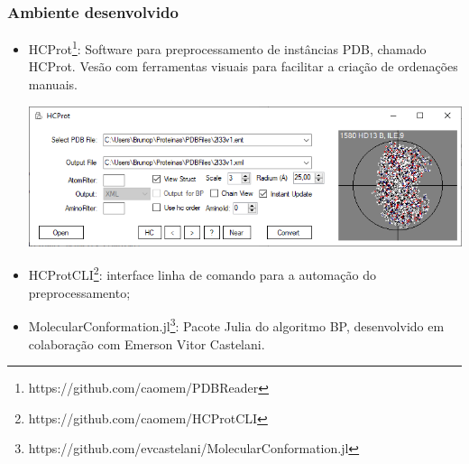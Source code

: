 \documentclass[10pt]{beamer}
\theoremstyle{plain}
\theoremstyle{definition}
\begin{document}
	\begin{frame}
		\frametitle{\normalsize Ambiente desenvolvido} 
		{
			\small
			
			
			\begin{itemize}
				\item HCProt\footnote{https://github.com/caomem/PDBReader}: Software para preprocessamento de instâncias PDB, chamado HCProt. Vesão com ferramentas visuais para facilitar a criação de ordenações manuais.
				\begin{center}
					\includegraphics[width=0.8\linewidth]{molproj.png}	
				\end{center}
				\item HCProtCLI\footnote{https://github.com/caomem/HCProtCLI}: interface linha de comando para a automação do preprocessamento;
				\vspace{0.2cm}
				\item MolecularConformation.jl\footnote{https://github.com/evcastelani/MolecularConformation.jl}: Pacote Julia do algoritmo BP, desenvolvido em colaboração com Emerson Vitor Castelani.
			\end{itemize}
		}	
	\end{frame}
\end{document}
